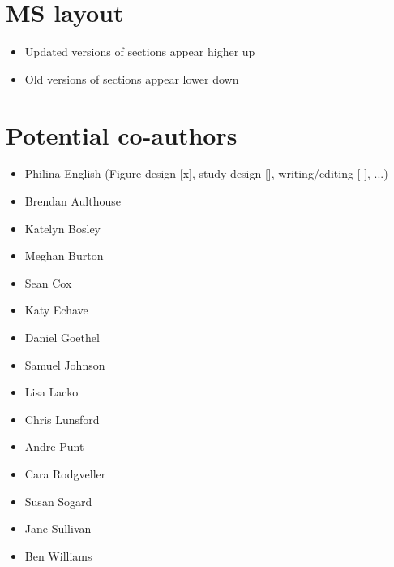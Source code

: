 \documentclass{article}
\begin{document}
\section{MS layout}
\begin{itemize}
\item Updated versions of sections appear higher up
\item Old versions of sections appear lower down
\end{itemize}


\section{Potential co-authors}

\begin{itemize}
    \item Philina English (Figure design [x], study design [], writing/editing [ ], ...)
    \item Brendan Aulthouse %
    \item Katelyn Bosley %
    \item Meghan Burton %
    \item Sean Cox
    \item Katy Echave %
    \item Daniel Goethel %
    \item Samuel Johnson %
    \item Lisa Lacko %
    \item Chris Lunsford
    \item Andre Punt
    \item Cara Rodgveller
    \item Susan Sogard %
    \item Jane Sullivan
    \item Ben Williams
\end{itemize}


% 
\end{document}
